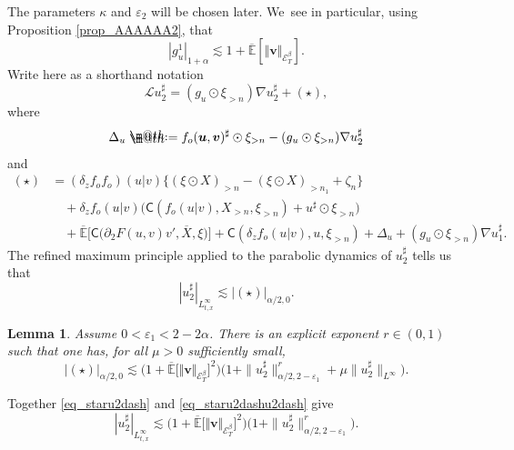 \documentclass[JEP,XML,SOM,Unicode,published]{cedram}
\makeatletter
\newtheorem{lem}[thm]{Lemma}
\theoremstyle{definition}
\let\epsilon\varepsilon
\newcommand\bbE{\mathbb{E}}
\newcommand{\mcE}{\mathcal{E}}
\newcommand{\bsu}{\boldsymbol{u}}
\newcommand{\bsv}{\boldsymbol{v}}
\newcommand*{\defeq}{\mathrel{\rlap{%
\raisebox{0.3ex}{$\m@th\cdot$}}%
\raisebox{-0.3ex}{$\m@th\cdot$}}%
=}
\newcommand{\norme}[1]{\Vert #1 \Vert}
\newcommand{\scrL}{\mathscr{L}}
\makeatother
\begin{document}
The parameters $\kappa$ and $\epsilon_2$ will be chosen later. We~see in particular, using Proposition \ref{prop_AAAAAA2}, that
\begin{equation}\label{eq_estimeegu1bis}
| g_u^1 |_{1 + \alpha} \lesssim 1 + \overline{\bbE}[\norme{\bsv}_{\mcE^\beta_T}].
\end{equation}
Write here as a shorthand notation
\[
\scrL u^{\sharp}_2 = (g_u \odot \xi_{> n}) \nabla u_2^{\sharp} + (\star),
\]
where
\[
\Delta_u \defeq f_o(\bsu,\bsv)^{\sharp} \odot \xi_{> n} - (g_u \odot \xi_{> n}) \nabla u_2^{\sharp}
\]
and
\begin{align*}
(\star) &= (\delta_z f_o f_o) (u\vert v) \{ (\xi\odot X)_{> n} - (\xi\odot X)_{> n_1} + \zeta_n \} \\
&\quad+ \delta_zf_o (u\vert v) \bigl(\mathsf{C} (f_o (u\vert v), X_{> n}, \xi_{> n}) + u^{\sharp} \odot \xi_{> n}\bigr)
\\
&\quad+ \overline{\bbE}\bigl[\mathsf{C}\bigl(\partial_2 F(u,v)v', \overline{X},\xi\bigr)\bigr]
+ \mathsf{C} (\delta_zf_o (u\vert v), u, \xi_{> n}) + \Delta_u + (g_u\odot \xi_{> n}) \nabla u_1^{\sharp}.
\end{align*}
The refined maximum principle \cite[Th.\,4.2]{ShenZhuZhu} applied to the parabolic dynamics of $u_2^{\sharp}$ tells us that
\begin{equation} \label{eq_staru2dash}
| u_2^{\sharp} |_{L^{\infty}_{t, x}} \lesssim | (\star) |_{\alpha / 2, 0}.
\end{equation}

\begin{lem} \label{lem_AAAAAA5} Assume $0 < \epsilon_1 < 2 - 2 \alpha$. There
is an explicit exponent $r\in(0,1)$ such that one has, for all $\mu>0$
sufficiently small,
\begin{equation} \label{eq_staru2dashu2dash}
| (\star) |_{\alpha / 2, 0} \lesssim \bigl(1+\overline{\bbE}\bigl[\norme{\bsv}_{\mcE^\beta_T}\bigr]^2\bigr) \bigl( 1 + \| u_2^{\sharp} \|^r_{\alpha / 2, 2 - \epsilon_1} + \mu \| u_2^{\sharp} \|_{L^{\infty}} \bigr).
\end{equation}
\end{lem}

Together \eqref{eq_staru2dash} and \eqref{eq_staru2dashu2dash} give
\[
| u_2^{\sharp} |_{L^{\infty}_{t, x}} \lesssim \bigl(1+\overline{\bbE}\bigl[\norme{\bsv}_{\mcE^\beta_T}\bigr]^2\bigr) \bigl( 1 + \| u_2^{\sharp} \|^r_{\alpha / 2, 2 - \epsilon_1} \bigr).
\]
\end{document}
